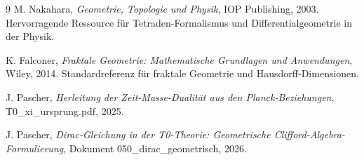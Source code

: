 \begin{thebibliography}{9}
	M. Nakahara,
	\textit{Geometrie, Topologie und Physik},
	IOP Publishing, 2003.
	Hervorragende Ressource für Tetraden-Formalismus und Differentialgeometrie in der Physik.
	
	K. Falconer,
	\textit{Fraktale Geometrie: Mathematische Grundlagen und Anwendungen},
	Wiley, 2014.
	Standardreferenz für fraktale Geometrie und Hausdorff-Dimensionen.
	
	J. Pascher,
	\textit{Herleitung der Zeit-Masse-Dualität aus den Planck-Beziehungen},
	T0\_xi\_ursprung.pdf,
	2025.
	
	J. Pascher,
	\textit{Dirac-Gleichung in der T0-Theorie: Geometrische Clifford-Algebra-Formulierung},
	Dokument 050\_dirac\_geometrisch,
	2026.

\end{thebibliography}
	